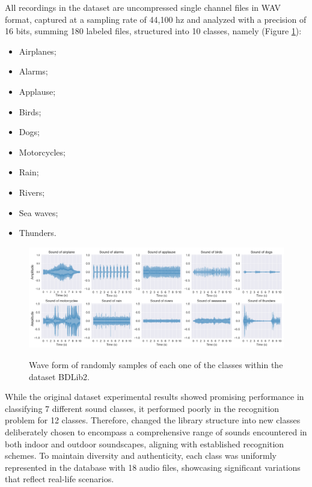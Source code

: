All recordings in the dataset are uncompressed single channel files in WAV format, captured at a sampling rate of 44,100 \gls{hz} and analyzed with a precision of 16 bits, summing 180 labeled files, structured into 10 classes, namely (Figure \ref{fig:methods_dataset_BDLib2}):
\begin{itemize}
    \item Airplanes;
    \item Alarms;
    \item Applause;
    \item Birds;
    \item Dogs; 
    \item Motorcycles;
    \item Rain;
    \item Rivers;
    \item Sea waves;
    \item Thunders. 
\end{itemize}

\begin{figure}[htbp]
    \raggedright
        \caption{Wave form of randomly samples of each one of the classes within the dataset BDLib2.}
        \includegraphics[width=1\textwidth]{resources/images/050-methods/Methods_dataset_BDLib2.png}
        \label{fig:methods_dataset_BDLib2}
\end{figure}

While the original dataset experimental results \cite{Bountourakis2015} showed promising performance in classifying 7 different sound classes, it performed poorly in the recognition problem for 12 classes. Therefore, \textcite{Bountourakis2019} changed the library structure into new classes deliberately chosen to encompass a comprehensive range of sounds encountered in both indoor and outdoor soundscapes, aligning with established recognition schemes. To maintain diversity and authenticity, each class was uniformly represented in the database with 18 audio files, showcasing significant variations that reflect real-life scenarios.

